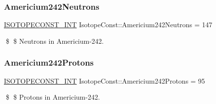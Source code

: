 \subsubsection{\texorpdfstring{Americium242\+Neutrons}{Americium242Neutrons}}
{\footnotesize\ttfamily \mbox{\hyperlink{group___isotope_const-_macros_ga5f18360b3e99483a35c32d789e62621c}{I\+S\+O\+T\+O\+P\+E\+C\+O\+N\+S\+T\+\_\+\+I\+NT}} Isotope\+Const\+::\+Americium242\+Neutrons = 147}

\$ \$ Neutrons in Americium-\/242. \mbox{\label{group___isotope_const-_americium-_am242_ga6311dde1e6b32dafcdfbbeef4a5de60e}} 
\subsubsection{\texorpdfstring{Americium242\+Protons}{Americium242Protons}}
{\footnotesize\ttfamily \mbox{\hyperlink{group___isotope_const-_macros_ga5f18360b3e99483a35c32d789e62621c}{I\+S\+O\+T\+O\+P\+E\+C\+O\+N\+S\+T\+\_\+\+I\+NT}} Isotope\+Const\+::\+Americium242\+Protons = 95}

\$ \$ Protons in Americium-\/242. 